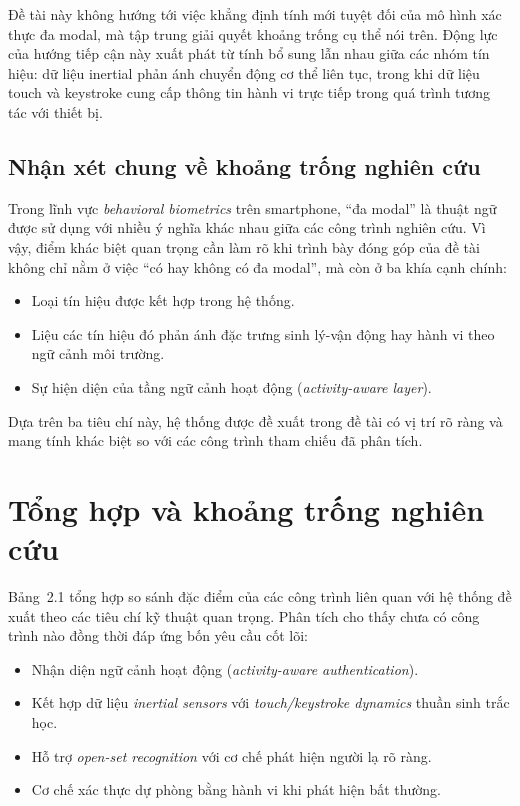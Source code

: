 \documentclass[../DoAn.tex]{subfiles}
\begin{document}
    Đề tài này không hướng tới việc khẳng định tính mới tuyệt đối của mô hình xác thực đa modal, mà tập trung giải quyết khoảng trống cụ thể nói trên. Động lực của hướng tiếp cận này xuất phát từ tính bổ sung lẫn nhau giữa các nhóm tín hiệu: dữ liệu inertial phản ánh chuyển động cơ thể liên tục, trong khi dữ liệu touch và keystroke cung cấp thông tin hành vi trực tiếp trong quá trình tương tác với thiết bị.

    \subsection{Nhận xét chung về khoảng trống nghiên cứu}
    
    Trong lĩnh vực \textit{behavioral biometrics} trên smartphone, ``đa modal'' là thuật ngữ được sử dụng với nhiều ý nghĩa khác nhau giữa các công trình nghiên cứu. Vì vậy, điểm khác biệt quan trọng cần làm rõ khi trình bày đóng góp của đề tài không chỉ nằm ở việc ``có hay không có đa modal'', mà còn ở ba khía cạnh chính:
    \begin{itemize}
        \item Loại tín hiệu được kết hợp trong hệ thống.
        
        \item Liệu các tín hiệu đó phản ánh đặc trưng sinh lý-vận động hay hành vi theo ngữ cảnh môi trường.
        
        \item Sự hiện diện của tầng ngữ cảnh hoạt động (\textit{activity-aware layer}).
    \end{itemize}
    
    Dựa trên ba tiêu chí này, hệ thống được đề xuất trong đề tài có vị trí rõ ràng và mang tính khác biệt so với các công trình tham chiếu đã phân tích.

    \section{Tổng hợp và khoảng trống nghiên cứu}

    Bảng~2.1 tổng hợp so sánh đặc điểm của các công trình liên quan với hệ thống đề xuất theo các tiêu chí kỹ thuật quan trọng. Phân tích cho thấy chưa có công trình nào đồng thời đáp ứng bốn yêu cầu cốt lõi:
    \begin{itemize}
        \item Nhận diện ngữ cảnh hoạt động (\textit{activity-aware authentication}).
        
        \item Kết hợp dữ liệu \textit{inertial sensors} với \textit{touch/keystroke dynamics} thuần sinh trắc học.
        
        \item Hỗ trợ \textit{open-set recognition} với cơ chế phát hiện người lạ rõ ràng.
        
        \item Cơ chế xác thực dự phòng bằng hành vi khi phát hiện bất thường.
    \end{itemize}
    
\end{document}
